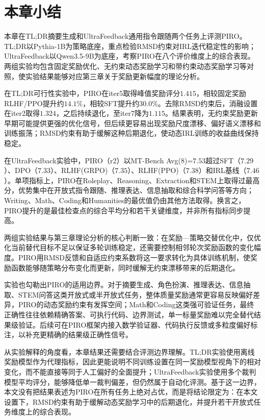 \section{本章小结}

本章在TL;DR摘要生成和UltraFeedback通用指令跟随两个任务上评测PIRO。TL;DR以Pythia-1B为策略底座，重点检验RMSD约束对IRL迭代稳定性的影响；UltraFeedback以Qwen3.5-9B为底座，考察PIRO在八个评价维度上的综合表现。两组实验均包含固定奖励优化、无约束动态奖励学习和带约束动态奖励学习等对照，使实验结果能够对应第三章关于奖励更新幅度的理论分析。

在TL;DR可行性实验中，PIRO在iter5取得峰值奖励评分$1.415$，相较固定奖励RLHF/PPO提升约$14.1\%$，相较SFT提升约$30.0\%$。去除RMSD约束后，消融设置在iter2取得$1.324$，之后持续退化，至iter7降为$1.115$。结果表明，无约束奖励更新早期可能提供更强的优化信号，但后续更容易出现奖励尺度漂移、偏好语义漂移和训练振荡；RMSD约束有助于缓解这种后期退化，使动态IRL训练的收益曲线保持稳定。

在UltraFeedback实验中，PIRO（r2）以MT-Bench Avg(8)=$7.53$超过SFT（$7.29$）、DPO（$7.33$）、RLHF(GRPO)（$7.35$）、RLHF(PPO)（$7.38$）和IRL基线（$7.46$）。单项指标上，PIRO在Roleplay、Reasoning、Extraction和STEM上取得过最高分，优势集中在开放式指令跟随、推理表达、信息抽取和综合科学问答等方向；Writing、Math、Coding和Humanities的最优值仍由其他方法取得。换言之，PIRO提升的是最佳检查点的综合平均分和若干关键维度，并非所有指标同步提高。

两组实验结果与第三章理论分析的核心判断一致：在奖励—策略交替优化中，仅优化当前替代目标不足以保证多轮训练稳定，还需要控制相邻轮次奖励函数的变化幅度。PIRO用RMSD反馈和自适应约束系数将这一要求转化为具体训练机制，使奖励函数能够随策略分布变化而更新，同时缓解无约束漂移带来的后期退化。

实验也勾勒出PIRO的适用边界。对于摘要生成、角色扮演、推理表达、信息抽取、STEM问答这类开放式或半开放式任务，整体质量奖励通常更容易反映偏好差异，PIRO的动态奖励约束有发挥空间；Math和Coding这类强可验证任务，最终正确性往往依赖精确答案、可执行代码、边界测试，单一标量奖励难以完全替代结果级验证。后续可在PIRO框架内接入数学验证器、代码执行反馈或多粒度偏好标注，以补充更精确的结果级正确性信号。

从实验解释的角度看，本章结果还需要结合评测边界理解。TL;DR实验使用离线奖励模型作为代理指标，因此更能说明不同训练设置在同一奖励模型视角下的相对变化，而不能直接等同于人工偏好的全面提升；UltraFeedback实验使用多个裁判模型平均评分，能够降低单一裁判偏差，但仍然属于自动化评测。基于这一边界，本文没有把结果表述为PIRO在所有任务上绝对占优，而是将结论限定为：在本文设置下，RMSD约束有助于缓解动态奖励学习中的后期退化，并提升若干开放式任务维度上的综合表现。

